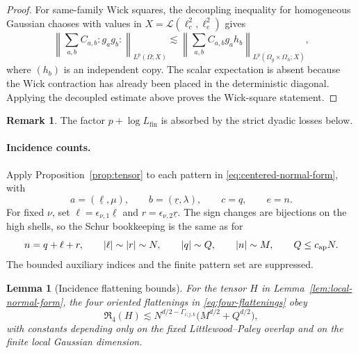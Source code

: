 \documentclass[11pt,reqno]{amsart}
\numberwithin{equation}{section}
\theoremstyle{plain}
\newtheorem{lemma}[theorem]{Lemma}
\theoremstyle{definition}
\newtheorem{remark}[theorem]{Remark}
\newcommand{\cL}{\mathcal L}
\newcommand{\wick}[1]{:#1:}
\newcommand{\Lfin}{L_{\mathrm{fin}}}
\begin{document}
\begin{proof}
For same-family Wick squares, the decoupling inequality for homogeneous Gaussian chaoses with values in \(X=\cL(\ell_c^2,\ell_e^2)\) gives
\begin{equation}\label{eq:decouple-wick}
        \left\|\sum_{a,b}C_{a,b}\wick{g_ag_b}\right\|_{L^p(\Omega;X)}
        \lesssim
        \left\|\sum_{a,b}C_{a,b}g_a h_b\right\|_{L^p(\Omega_g\times\Omega_h;X)},
\end{equation}
where \((h_b)\) is an independent copy.  The scalar expectation is absent because the Wick contraction has already been placed in the deterministic diagonal.  Applying the decoupled estimate above proves the Wick-square statement.
\end{proof}


\begin{remark}\label{rem:tensor-sharpness}
The factor \(p+\log\Lfin\) is absorbed by the strict dyadic losses below.
\end{remark}

\paragraph{Incidence counts.}\label{subsec:incidence-counts}
Apply Proposition~\ref{prop:tensor} to each pattern in
\eqref{eq:centered-normal-form}, with
\[
        a=(\underline\ell,\mu),
        \qquad b=(\underline r,\lambda),
        \qquad c=q,
        \qquad e=n.
\]
For fixed \(\nu\), set
\(\ell=\epsilon_{\nu,1}\underline\ell\) and
\(r=\epsilon_{\nu,2}\underline r\).  The sign changes are bijections on the
high shells, so the Schur bookkeeping is the same as for
\[
        n=q+\ell+r,
        \qquad |\ell|\sim |r|\sim N,
        \qquad |q|\sim Q,
        \qquad |n|\sim M,
        \qquad Q\le c_{\rm ap}N.
\]
The bounded auxiliary indices and the finite pattern set are suppressed.

\begin{lemma}[Incidence flattening bounds]\label{lem:incidence-flattenings}
For the tensor \(H\) in Lemma~\ref{lem:local-normal-form}, the four
oriented flattenings in \eqref{eq:four-flattenings} obey
\begin{equation}\label{eq:R-H-count}
        \mathfrak R_4(H)
        \lesssim N^{d/2-\Gamma_{i;j,k}}\bigl(M^{d/2}+Q^{d/2}\bigr),
\end{equation}
with constants depending only on the fixed Littlewood--Paley overlap and on the finite local Gaussian dimension.
\end{lemma}
\end{document}
